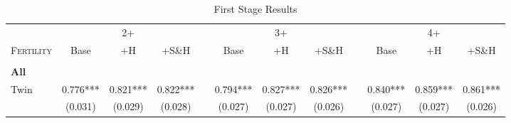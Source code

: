 \begin{landscape}\begin{table}[htpb!]\caption{First Stage Results} 
\label{TWINtab:FS}\begin{center}\begin{tabular}{lcccp{2mm}cccp{2mm}ccc}
\toprule \toprule 
&\multicolumn{3}{c}{2+}&&\multicolumn{3}{c}{3+}&&\multicolumn{3}{c}{4+}\\ \cmidrule(r){2-4} \cmidrule(r){6-8} \cmidrule(r){10-12} 
\textsc{Fertility}&Base&+H&+S\&H&&Base&+H&+S\&H&&Base&+H&+S\&H\\ \midrule 
\begin{footnotesize}\end{footnotesize}& 
\begin{footnotesize}\end{footnotesize}& 
\begin{footnotesize}\end{footnotesize}& 
\begin{footnotesize}\end{footnotesize}& 
\begin{footnotesize}\end{footnotesize}& 
\begin{footnotesize}\end{footnotesize}& 
\begin{footnotesize}\end{footnotesize}& 
\begin{footnotesize}\end{footnotesize}& 
\begin{footnotesize}\end{footnotesize}& 
\begin{footnotesize}\end{footnotesize}\\ 
\multicolumn{12}{l}{\textbf{All}}\\ 
Twin&0.776***&0.821***&0.822***&&0.794***&0.827***&0.826***&&0.840***&0.859***&0.861***\\
&(0.031)&(0.029)&(0.028)&&(0.027)&(0.027)&(0.026)&&(0.027)&(0.027)&(0.026)\\

\end{tabular}
\end{center}
\end{table}
\end{landscape}

